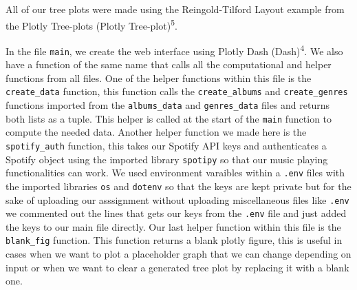 \documentclass[fontsize=11pt]{article}
\begin{document}
All of our tree plots were made using the Reingold-Tilford Layout example from the Plotly Tree-plots (Plotly Tree-plot)\textsuperscript{5}. \newline

In the file \texttt{main}, we create the web interface using Plotly Dash (Dash)\textsuperscript{4}. We also have a function of the same name that calls all the computational and helper functions from all files. One of the helper functions within this file is the \texttt{create\_data} function, this function calls the \texttt{create\_albums} and \texttt{create\_genres} functions imported from the \texttt{albums\_data} and \texttt{genres\_data} files and returns both lists as a tuple. This helper is called at the start of the \texttt{main} function to compute the needed data. Another helper function we made here is the \texttt{spotify\_auth} function, this takes our Spotify API keys and authenticates a Spotify object using the imported library \texttt{spotipy} so that our music playing functionalities can work. We used environment varaibles within a \texttt{.env} files with the imported libraries \texttt{os} and \texttt{dotenv} so that the keys are kept private but for the sake of uploading our asssignment without uploading miscellaneous files like \texttt{.env} we commented out the lines that gets our keys from the \texttt{.env} file and just added the keys to our main file directly. Our last helper function within this file is the \texttt{blank\_fig} function. This function returns a blank plotly figure, this is useful in cases when we want to plot a placeholder graph that we can change depending on input or when we want to clear a generated tree plot by replacing it with a blank one. \newline
\end{document}
